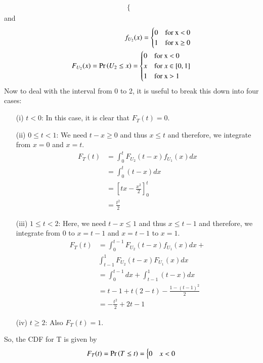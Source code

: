 \documentclass[journal,12pt,twocolumn]{IEEEtran}
\renewcommand\thesection{\arabic{section}}
\begin{document}
\begin{enumerate}[label=\thesection.\arabic*
,ref=\thesection.\theenumi]
\begin{align*}
\begin{cases}
    \end{cases}       
\end{align*} and 
\begin{align*}
f_{U_2}(x)=
	 \begin{cases}
    0 & \text{for x $<$ 0}\\
      1 & \text{for x $\geq$ 0}
    \end{cases}
     \\
  F_{U_2}(x)=\Pr\left(U_2 \le x\right) =
    \begin{cases}
    0 & \text{for x $<$ 0}\\
      x & \text{for}~x\in [0,1]\\
      1 & \text{for x $>$ 1}
    \end{cases}  
\end{align*}
Now to deal with the interval from 0 to 2, it is useful to break this down into four cases:
\begin{enumerate}
\item[(i)] $t < 0$: In this case, it is clear that $F_T(t) = 0$.
\item[(ii)] $0 \leq t < 1$: We need $t-x\geq 0$ and thus $x\leq t$ and therefore, we integrate from $x=0$ and $x=t$. 
\begin{align*}
F_T(t)&=\int_{0}^{t}F_{U_2}(t - x)f_{U_1}(x)dx\\
&=\int_{0}^{t}(t - x)dx\\
&=\left[tx-\frac{x^2}{2}\right]_0^t\\
&=\frac{t^2}{2}
\end{align*}
\item[(iii)] $1 \leq t < 2$: Here, we need $t-x\leq 1$ and thus $x\leq t-1$ and therefore, we integrate from $0$ to $x=t-1$ and $x=t-1$ to $x=1$. 
\begin{align*}
F_T(t)&=\int_{0}^{t-1}F_{U_2}(t - x)f_{U_1}(x)dx +\\
&\int_{t-1}^{1}F_{U_2}(t - x)F_{U_1}(x)dx\\
&= \int_{0}^{t - 1}dx + \int_{t - 1}^{1}(t - x)dx \\
&= t - 1 + t(2 - t) - \frac{1 - (t - 1)^2}{2} \\
&= -\frac{t^2}{2} + 2t - 1
\end{align*}
\item[(iv)] $t \geq 2$: Also $F_T(t) = 1$.
\end{enumerate}
So, the CDF for T is given by 
\begin{equation}
F_{T}(t)=\Pr\left(T \le t\right) =
    \begin{cases}
    0 &  x< 0\\

\end{cases}
\end{equation}
\end{enumerate}
\end{document}
